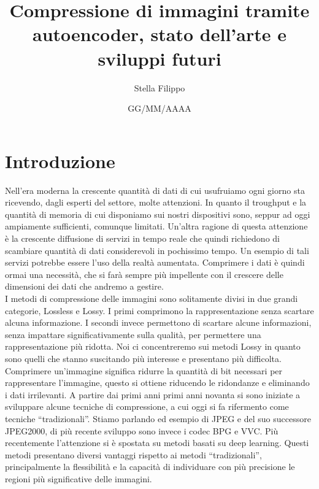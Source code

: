 \documentclass[12pt,a4paper,twoside,openright]{extreport}
\title{Compressione di immagini tramite autoencoder, stato dell’arte e sviluppi futuri}
\author{Stella Filippo}
\date{GG/MM/AAAA}
\begin{document}
    \pagestyle{empty} %

    
    \cleardoublepage
    
    
    \cleardoublepage

    \pagestyle{plain} %

    \chapter*{Introduzione}
    Nell’era moderna la crescente quantità di dati di cui usufruiamo ogni giorno sta ricevendo, dagli esperti del settore, molte attenzioni. In quanto il troughput e la quantità di memoria di cui disponiamo sui nostri dispositivi sono, seppur ad oggi ampiamente sufficienti, comunque limitati. Un’altra ragione di questa attenzione è la crescente diffusione di servizi in tempo reale che quindi richiedono di scambiare quantità di dati considerevoli in pochissimo tempo. Un esempio di tali servizi potrebbe essere l’uso della realtà aumentata.
    Comprimere i dati è quindi ormai una necessità, che si farà sempre più impellente con il crescere delle dimensioni dei dati che andremo a gestire.\\
    I metodi di compressione delle immagini sono solitamente divisi in due grandi categorie, Lossless e Lossy. I primi comprimono la rappresentazione senza scartare alcuna informazione. I secondi invece permettono di scartare alcune informazioni, senza impattare significativamente sulla qualità, per permettere una rappresentazione più ridotta.\cite{sadeeq2021image}
    Noi ci concentreremo sui metodi Lossy in quanto sono quelli che stanno suscitando più interesse e presentano più difficolta.\\
    Comprimere un’immagine significa ridurre la quantità di bit necessari per rappresentare l’immagine, questo si ottiene riducendo le ridondanze e eliminando i dati irrilevanti. \cite{mishra2022deep}
    A partire dai primi anni primi anni novanta si sono iniziate a sviluppare alcune tecniche di compressione, a cui oggi si fa rifermento come tecniche “tradizionali”. Stiamo parlando ed esempio di JPEG e del suo successore JPEG2000, di più recente sviluppo sono invece i codec BPG e VVC.
    Più recentemente l’attenzione si è spostata su metodi basati su deep learning. Questi metodi presentano diversi vantaggi rispetto ai metodi “tradizionali”, principalmente la flessibilità e la capacità di individuare con più precisione le regioni più significative delle immagini.
\end{document}
